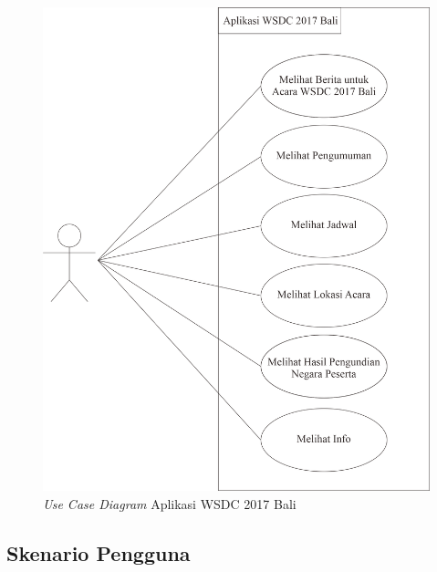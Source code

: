 \begin{figure}[H]
		\centering
	    \includegraphics[scale=0.35]{Gambar/useCaseDiagram.png}
	    \caption{{\it Use Case Diagram} Aplikasi WSDC 2017 Bali}
	    \label{fig:useCaseDiagram}
\end{figure}

\subsection{Skenario Pengguna}
\label{sec:skenarioPenggunaAplikasiSistemKini}

